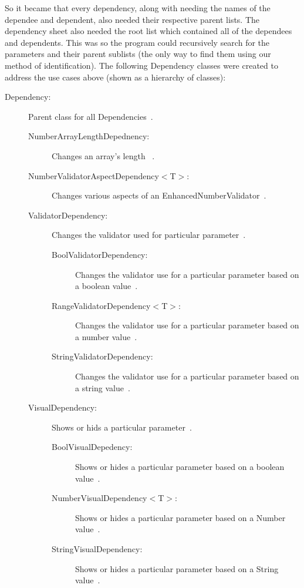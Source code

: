	So it became that every dependency, along with needing the names of the dependee
	and dependent, also needed their respective parent lists. The dependency sheet also needed the root list which contained all of the dependees and dependents.
	This was so the program could recursively search for the parameters and their parent sublists (the only way to find them using our method of identification). 
	The following Dependency classes were created to address the use cases above (shown as a hierarchy of classes):
	\begin{description}
		\item[Dependency:] Parent class for all Dependencies~\cite{Dependency}.
		\begin{description}
			\item[NumberArrayLengthDepednency:] Changes an array's length~\cite{NumberArrayLengthDependency} .
			\item[NumberValidatorAspectDependency$<$T$>$:] Changes various aspects of an EnhancedNumberValidator~\cite{NumberValidatorAspectDependency}.
			\item[ValidatorDependency:] Changes the validator used for particular parameter~\cite{ValidatorDependency}.
			\begin{description}
				\item[BoolValidatorDependency:]Changes the validator use for a particular parameter based on a boolean value~\cite{BoolValidatorDependency}.
				\item[RangeValidatorDependency$<$T$>$:] Changes the validator use for a particular parameter based on a number value~\cite{RangeValidatorDependency}.
				\item[StringValidatorDependency:] Changes the validator use for a particular parameter based on a string value~\cite{StringValidatorDependency}.
			\end{description}	
			\item [VisualDependency:] Shows or hids a particular parameter~\cite{VisualDependency}.
			\begin{description}
				\item[BoolVisualDepedency:] Shows or hides a particular parameter based on a boolean value~\cite{BoolVisualDependency}.
				\item[NumberVisualDependency$<$T$>$:] Shows or hides a particular parameter based on a Number value~\cite{NumberVisualDependency}.
				\item[StringVisualDependency:] Shows or hides a particular parameter based on a String value~\cite{StringVisualDependency}.
			\end{description}
		\end{description}
	\end{description}

